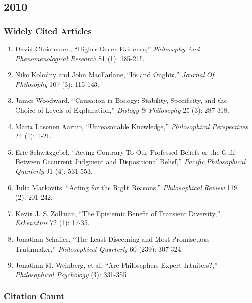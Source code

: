 \documentclass[
  10pt,
  letterpaper,
  DIV=11,
  numbers=noendperiod,
  twoside]{scrartcl}
\providecommand{\tightlist}{%
  \setlength{\itemsep}{0pt}\setlength{\parskip}{0pt}}\usepackage{longtable,booktabs,array}
\begin{document}
\newpage

\subsection{2010}\label{sec-s2010}

\subsubsection*{Widely Cited Articles}\label{widely-cited-articles-34}

\begin{enumerate}
\def\labelenumi{\arabic{enumi}.}
\tightlist
\item
  David Christensen, ``Higher-Order Evidence,'' \emph{Philosophy And
  Phenomenological Research} 81 (1): 185-215.
\item
  Niko Kolodny and John MacFarlane, ``Ifs and Oughts,'' \emph{Journal Of
  Philosophy} 107 (3): 115-143.
\item
  James Woodward, ``Causation in Biology: Stability, Specificity, and
  the Choice of Levels of Explanation,'' \emph{Biology \& Philosophy} 25
  (3): 287-318.
\item
  Maria Lasonen Aarnio, ``Unreasonable Knowledge,'' \emph{Philosophical
  Perspectives} 24 (1): 1-21.
\item
  Eric Schwitzgebel, ``Acting Contrary To Our Professed Beliefs or the
  Gulf Between Occurrent Judgment and Dispositional Belief,''
  \emph{Pacific Philosophical Quarterly} 91 (4): 531-553.
\item
  Julia Markovits, ``Acting for the Right Reasons,'' \emph{Philosophical
  Review} 119 (2): 201-242.
\item
  Kevin J. S. Zollman, ``The Epistemic Benefit of Transient Diversity,''
  \emph{Erkenntnis} 72 (1): 17-35.
\item
  Jonathan Schaffer, ``The Least Discerning and Most Promiscuous
  Truthmaker,'' \emph{Philosophical Quarterly} 60 (239): 307-324.
\item
  Jonathan M. Weinberg, et al, ``Are Philosophers Expert Intuiters?,''
  \emph{Philosophical Psychology} (3): 331-355.
\end{enumerate}

\subsubsection*{Citation Count}\label{sec-count-2010}
\end{document}
